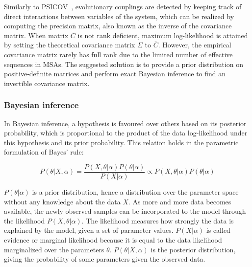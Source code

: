         Similarly to PSICOV~\cite{doi:10.1093/bioinformatics/btr638}, evolutionary couplings are detected by keeping track of direct interactions
        between variables of the system, which can be realized by computing the precision matrix, also known as the inverse of the covariance matrix.
        When matrix $\bar{C}$ is not rank deficient, maximum log-likelihood is attained by setting the theoretical covariance matrix
        $\Sigma$ to $\bar{C}$. However, the empirical covariance matrix rarely has full rank due to the limited number of effective sequences
        in MSAs. The suggested solution is to provide a prior distribution on positive-definite matrices and perform exact Bayesian inference
        to find an invertible covariance matrix.

        \subsubsection{Bayesian inference}

            In Bayesian inference, a hypothesis is favoured over others based on its posterior probability,
            which is proportional to the product of the data log-likelihood under this hypothesis
            and its prior probability. This relation holds in the parametric formulation of Bayes' rule:

            \begin{equation}
                P(\theta \vert X, \alpha) = \frac{P(X, \theta \vert \alpha) P(\theta \vert \alpha)}{P(X \vert \alpha)} \propto
                P(X, \theta \vert \alpha) P(\theta \vert \alpha)
            \end{equation}

            $P(\theta \vert \alpha)$ is a prior distribution, hence a distribution over the parameter space without
            any knowledge about the data $X$. As more and more data becomes available, the newly observed samples can be
            incorporated to the model through the likelihood $P(X, \theta \vert \alpha)$. The likelihood measures how strongly
            the data is explained by the model, given a set of parameter values. $P(X \vert \alpha)$ is called evidence or
            marginal likelihood because it is equal to the data likelihood marginalized over the parameters $\theta$.
            $P(\theta \vert X, \alpha)$ is the posterior distribution, giving the probability of some parameters given  %
            the observed data.

